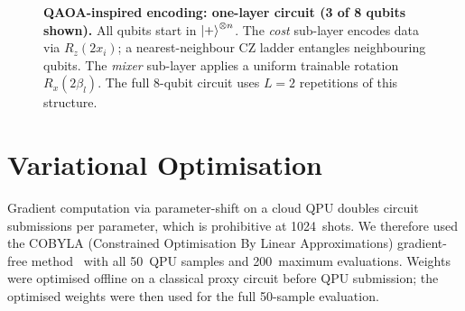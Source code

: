 \documentclass[twocolumn,aps,pra,superscriptaddress,floatfix]{revtex4-2}
\newcommand{\cobyla}{\textsc{COBYLA}}
\begin{document}
\begin{figure}[!t]
\centering
{}
\caption{%
  \textbf{QAOA-inspired encoding: one-layer circuit (3 of 8 qubits shown).}
  All qubits start in $\ket{+}^{\otimes n}$.
  The \emph{cost} sub-layer encodes data via $R_z(2x_i)$; a nearest-neighbour
  CZ ladder entangles neighbouring qubits.
  The \emph{mixer} sub-layer applies a uniform trainable rotation $R_x(2\beta_l)$.
  The full 8-qubit circuit uses $L=2$ repetitions of this structure.
}
\label{fig:qaoa_circuit}
\end{figure}

\section{Variational Optimisation}
\label{sec:optimisation}

Gradient computation via parameter-shift on a cloud QPU doubles circuit
submissions per parameter, which is prohibitive at 1024~shots.
We therefore used the \cobyla{} (Constrained Optimisation By Linear
Approximations) gradient-free method~\cite{powell1994} with all 50~QPU
samples and 200~maximum evaluations.
Weights were optimised offline on a classical proxy circuit before QPU
submission; the optimised weights were then used for the full 50-sample
evaluation.
\end{document}
